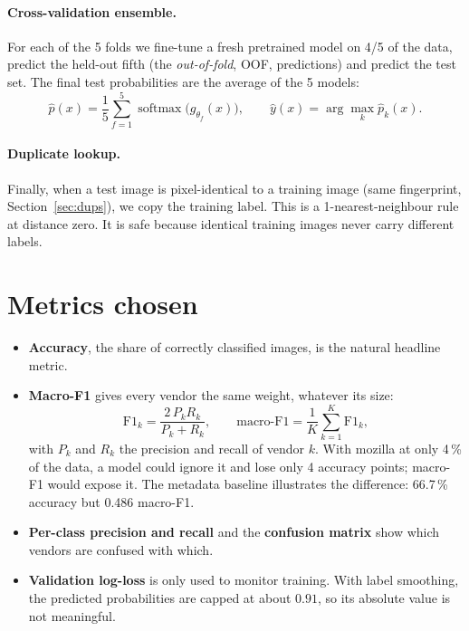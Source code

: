 \documentclass[11pt,a4paper]{article}
\newcommand{\vendor}[1]{\textsf{#1}}
\begin{document}
\paragraph{Cross-validation ensemble.} For each of the 5 folds we fine-tune a fresh pretrained model on
4/5 of the data, predict the held-out fifth (the \emph{out-of-fold}, OOF, predictions) and predict the
test set. The final test probabilities are the average of the 5 models:
\begin{equation}
  \hat p(x) = \frac15\sum_{f=1}^{5} \operatorname{softmax}\big(g_{\theta_f}(x)\big), \qquad
  \hat y(x) = \arg\max_k \hat p_k(x).
\end{equation}

\paragraph{Duplicate lookup.} Finally, when a test image is pixel-identical to a training image
(same fingerprint, Section~\ref{sec:dups}), we copy the training label. This is a 1-nearest-neighbour
rule at distance zero. It is safe because identical training images never carry different labels.

\section{Metrics chosen}
\label{sec:metrics}

\begin{itemize}
  \item \textbf{Accuracy}, the share of correctly classified images, is the natural headline metric.
  \item \textbf{Macro-F1} gives every vendor the same weight, whatever its size:
  \begin{equation}
    \text{F1}_k = \frac{2\,P_k R_k}{P_k + R_k},\qquad
    \text{macro-F1} = \frac{1}{K}\sum_{k=1}^{K}\text{F1}_k ,
  \end{equation}
  with $P_k$ and $R_k$ the precision and recall of vendor $k$. With \vendor{mozilla} at only 4\,\% of
  the data, a model could ignore it and lose only 4 accuracy points; macro-F1 would expose it. The
  metadata baseline illustrates the difference: 66.7\,\% accuracy but 0.486 macro-F1.
  \item \textbf{Per-class precision and recall} and the \textbf{confusion matrix} show which vendors are
  confused with which.
  \item \textbf{Validation log-loss} is only used to monitor training. With label smoothing, the
  predicted probabilities are capped at about $0.91$, so its absolute value is not meaningful.
\end{itemize}
\end{document}
